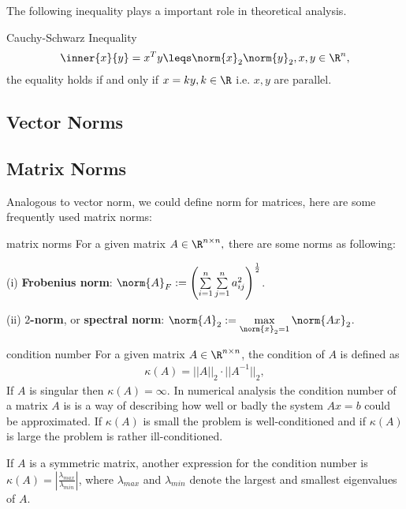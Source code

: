The following inequality plays a important role in theoretical analysis.
\begin{theorem}{Cauchy-Schwarz Inequality}{}
    \begin{equation*}
        \inner{x}{y}=x^Ty\leqs \norm{x}_2\norm{y}_2, x,y\in \R^n,
    \end{equation*}
    the equality holds if and only if $x = ky,k\in \R$ i.e. $x,y$ are parallel.
\end{theorem}

\subsection{Vector Norms}

\subsection{Matrix Norms}
Analogous to vector norm, we could define norm for matrices, here are some frequently used matrix norms:
\begin{definition}{matrix norms}{}
    For a given matrix $A\in \R^{n\times n},$ there are some norms as following:

    (i) \textbf{Frobenius norm}: $\norm{A}_F:=\left(\sum\limits_{i=1}^n\sum\limits_{j=1}^na_{ij}^2\right)^{\frac{1}{2}}$.

  (ii) \textbf{$2$-norm}, or \textbf{spectral norm}: $\norm{A}_2:=\max\limits_{\norm{x}_2=1}\norm{Ax}_2$.
\end{definition}

\begin{definition}{condition number}{}
    For a given matrix $A\in \R^{n\times n}$, the condition of $A$ is defined as
    \begin{align*}
        \kappa(A) = ||A||_2\cdot ||A^{-1}||_2,
    \end{align*}
    If $A$ is singular then $\kappa(A)=\infty$. 
    In numerical analysis the condition number of a matrix $A$ is is a way of describing how well or badly the system
    $Ax=b$ could be approximated. If $\kappa(A)$ is small the problem is well-conditioned and if
    $\kappa(A)$ is large the problem is rather ill-conditioned.
\end{definition}
\begin{remark}
    If $A$ is a symmetric matrix, another expression for the condition number is $\kappa(A) = |\frac{\lambda_{max}}{\lambda_{min}}|$, where $\lambda_{max}$ and $\lambda_{min}$
    denote the largest and smallest eigenvalues of $A$.
\end{remark}

